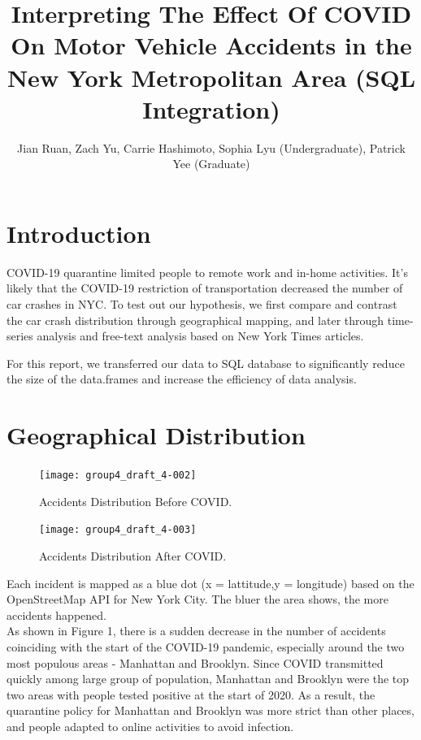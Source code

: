 \documentclass[10pt]{article}
\begin{document}

\title{Interpreting The Effect Of COVID On Motor Vehicle Accidents in the New York Metropolitan Area (SQL Integration)}
\author{Jian Ruan, Zach Yu, Carrie Hashimoto, Sophia Lyu (Undergraduate), Patrick Yee (Graduate)}
\maketitle



\section{Introduction}
COVID-19 quarantine limited people to remote work and in-home activities. It's likely that the COVID-19 restriction of transportation decreased the number of car crashes in NYC. To test out our hypothesis, we first compare and contrast the car crash distribution through geographical mapping, and later through time-series analysis and free-text analysis based on New York Times articles. 

For this report, we transferred our data to SQL database to significantly reduce the size of the data.frames and increase the efficiency of data analysis. 

\section{Geographical Distribution}
\begin{figure}[H]
\centering
\texttt{[image: group4\_draft\_4-002]}
\caption{Accidents Distribution Before COVID.}
\end{figure}

\begin{figure}[H]
\centering
\texttt{[image: group4\_draft\_4-003]}
\caption{Accidents Distribution After COVID.}
\end{figure}

Each incident is mapped as a blue dot (x = lattitude,y = longitude) based on the OpenStreetMap API for New York City. The bluer the area shows, the more accidents happened. \\
\noindent
As shown in Figure 1, there is a sudden decrease in the number of accidents coinciding with the start of the COVID-19 pandemic, especially around the two most populous areas - Manhattan and Brooklyn. Since COVID transmitted quickly among large group of population, Manhattan and Brooklyn were the top two areas with people tested positive at the start of 2020. As a result, the quarantine policy for Manhattan and Brooklyn was more strict than other places, and people adapted to online activities to avoid infection.
\end{document}

